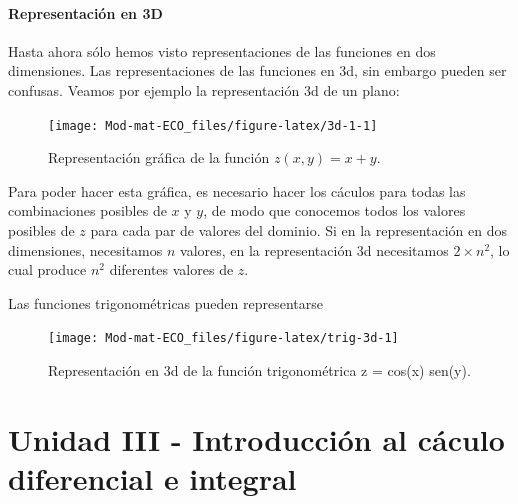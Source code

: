 \documentclass[
]{book}
\begin{document}
\hypertarget{representaciuxf3n-en-3d}{%
\subsubsection{Representación en 3D}\label{representaciuxf3n-en-3d}}

Hasta ahora sólo hemos visto representaciones de las funciones en dos dimensiones. Las representaciones de las funciones en 3d, sin embargo pueden ser confusas. Veamos por ejemplo la representación 3d de un plano:

\begin{figure}

{\centering \texttt{[image: Mod-mat-ECO\_files/figure-latex/3d-1-1]} 

}

\caption{Representación gráfica de la función $z(x, y) = x + y$.}\label{fig:3d-1}
\end{figure}

Para poder hacer esta gráfica, es necesario hacer los cáculos para todas las combinaciones posibles de \(x\) y \(y\), de modo que conocemos todos los valores posibles de \(z\) para cada par de valores del dominio. Si en la representación en dos dimensiones, necesitamos \(n\) valores, en la representación 3d necesitamos \(2 \times n^2\), lo cual produce \(n^2\) diferentes valores de \(z\).

Las funciones trigonométricas pueden representarse

\begin{figure}

{\centering \texttt{[image: Mod-mat-ECO\_files/figure-latex/trig-3d-1]} 

}

\caption{Representación en 3d de la función trigonométrica z = cos(x) sen(y).}\label{fig:trig-3d}
\end{figure}

\hypertarget{unidad-iii---introducciuxf3n-al-cuxe1culo-diferencial-e-integral}{%
\chapter{Unidad III - Introducción al cáculo diferencial e integral}\label{unidad-iii---introducciuxf3n-al-cuxe1culo-diferencial-e-integral}}

  
\end{document}
